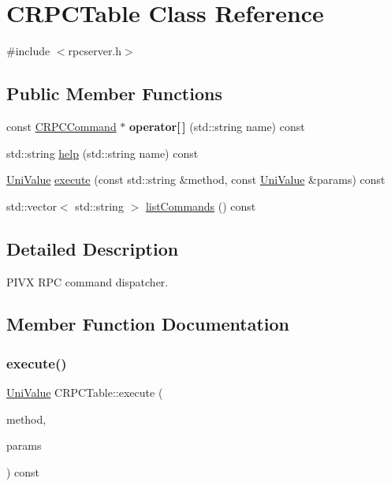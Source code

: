 \hypertarget{class_c_r_p_c_table}{}\section{C\+R\+P\+C\+Table Class Reference}
\label{class_c_r_p_c_table}


{\ttfamily \#include $<$rpcserver.\+h$>$}

\subsection*{Public Member Functions}
\begin{DoxyCompactItemize}
\item 
\mbox{\label{class_c_r_p_c_table_a3d0faa5bfca42b473063981fa8d0fa75}} 
const \mbox{\hyperlink{class_c_r_p_c_command}{C\+R\+P\+C\+Command}} $\ast$ {\bfseries operator\mbox{[}$\,$\mbox{]}} (std\+::string name) const
\item 
std\+::string \mbox{\hyperlink{class_c_r_p_c_table_aaba3a5908a430d07084292d5a894c812}{help}} (std\+::string name) const
\item 
\mbox{\hyperlink{class_uni_value}{Uni\+Value}} \mbox{\hyperlink{class_c_r_p_c_table_a30bfd77e85ecc56b58da3f8582af1ac8}{execute}} (const std\+::string \&method, const \mbox{\hyperlink{class_uni_value}{Uni\+Value}} \&params) const
\item 
std\+::vector$<$ std\+::string $>$ \mbox{\hyperlink{class_c_r_p_c_table_a7ebce2fd23e8343e42d36a9bcd02de95}{list\+Commands}} () const
\end{DoxyCompactItemize}


\subsection{Detailed Description}
P\+I\+VX R\+PC command dispatcher. 

\subsection{Member Function Documentation}
\mbox{\label{class_c_r_p_c_table_a30bfd77e85ecc56b58da3f8582af1ac8}} 
\subsubsection{\texorpdfstring{execute()}{execute()}}
{\footnotesize\ttfamily \mbox{\hyperlink{class_uni_value}{Uni\+Value}} C\+R\+P\+C\+Table\+::execute (\begin{DoxyParamCaption}\item[{const std\+::string \&}]{method,  }\item[{const \mbox{\hyperlink{class_uni_value}{Uni\+Value}} \&}]{params }\end{DoxyParamCaption}) const}

